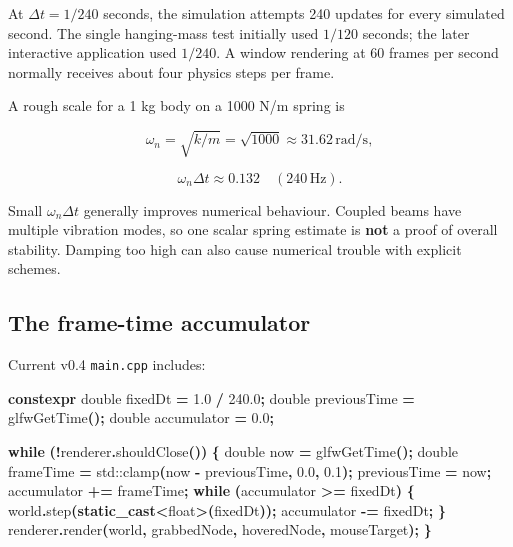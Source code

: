 \documentclass[
  10pt,
  a4paper,
]{article}
\newenvironment{Shaded}{\begin{snugshade}}{\end{snugshade}}
\newcommand{\BuiltInTok}[1]{#1}
\newcommand{\ControlFlowTok}[1]{\textcolor[rgb]{0.13,0.29,0.53}{\textbf{#1}}}
\newcommand{\DataTypeTok}[1]{\textcolor[rgb]{0.13,0.29,0.53}{#1}}
\newcommand{\FloatTok}[1]{\textcolor[rgb]{0.00,0.00,0.81}{#1}}
\newcommand{\KeywordTok}[1]{\textcolor[rgb]{0.13,0.29,0.53}{\textbf{#1}}}
\newcommand{\NormalTok}[1]{#1}
\newcommand{\OperatorTok}[1]{\textcolor[rgb]{0.81,0.36,0.00}{\textbf{#1}}}
\begin{document}
At \(\Delta t=1/240\) seconds, the simulation attempts 240 updates for
every simulated second. The single hanging-mass test initially used
\(1/120\) seconds; the later interactive application used \(1/240\). A
window rendering at 60 frames per second normally receives about four
physics steps per frame.

A rough scale for a 1 kg body on a 1000 N/m spring is

\[\omega_n=\sqrt{k/m}=\sqrt{1000}\approx31.62\,\mathrm{rad/s},\]

\[\omega_n\Delta t\approx0.132\quad(240\,\mathrm{Hz}).\]

Small \(\omega_n\Delta t\) generally improves numerical behaviour.
Coupled beams have multiple vibration modes, so one scalar spring
estimate is \textbf{not} a proof of overall stability. Damping too high
can also cause numerical trouble with explicit schemes.

\subsection{The frame-time
accumulator}\label{the-frame-time-accumulator}

Current v0.4 \texttt{main.cpp} includes:

\begin{Shaded}
\begin{Highlighting}[]
\KeywordTok{constexpr} \DataTypeTok{double}\NormalTok{ fixedDt }\OperatorTok{=} \FloatTok{1.0} \OperatorTok{/} \FloatTok{240.0}\OperatorTok{;}
\DataTypeTok{double}\NormalTok{ previousTime }\OperatorTok{=}\NormalTok{ glfwGetTime}\OperatorTok{();}
\DataTypeTok{double}\NormalTok{ accumulator }\OperatorTok{=} \FloatTok{0.0}\OperatorTok{;}

\ControlFlowTok{while} \OperatorTok{(!}\NormalTok{renderer}\OperatorTok{.}\NormalTok{shouldClose}\OperatorTok{())} \OperatorTok{\{}
    \DataTypeTok{double}\NormalTok{ now }\OperatorTok{=}\NormalTok{ glfwGetTime}\OperatorTok{();}
    \DataTypeTok{double}\NormalTok{ frameTime }\OperatorTok{=} \BuiltInTok{std::}\NormalTok{clamp}\OperatorTok{(}\NormalTok{now }\OperatorTok{{-}}\NormalTok{ previousTime}\OperatorTok{,} \FloatTok{0.0}\OperatorTok{,} \FloatTok{0.1}\OperatorTok{);}
\NormalTok{    previousTime }\OperatorTok{=}\NormalTok{ now}\OperatorTok{;}
\NormalTok{    accumulator }\OperatorTok{+=}\NormalTok{ frameTime}\OperatorTok{;}
    \ControlFlowTok{while} \OperatorTok{(}\NormalTok{accumulator }\OperatorTok{\textgreater{}=}\NormalTok{ fixedDt}\OperatorTok{)} \OperatorTok{\{}
\NormalTok{        world}\OperatorTok{.}\NormalTok{step}\OperatorTok{(}\KeywordTok{static\_cast}\OperatorTok{\textless{}}\DataTypeTok{float}\OperatorTok{\textgreater{}(}\NormalTok{fixedDt}\OperatorTok{));}
\NormalTok{        accumulator }\OperatorTok{{-}=}\NormalTok{ fixedDt}\OperatorTok{;}
    \OperatorTok{\}}
\NormalTok{    renderer}\OperatorTok{.}\NormalTok{render}\OperatorTok{(}\NormalTok{world}\OperatorTok{,}\NormalTok{ grabbedNode}\OperatorTok{,}\NormalTok{ hoveredNode}\OperatorTok{,}\NormalTok{ mouseTarget}\OperatorTok{);}
\OperatorTok{\}}
\end{Highlighting}
\end{Shaded}
\end{document}
